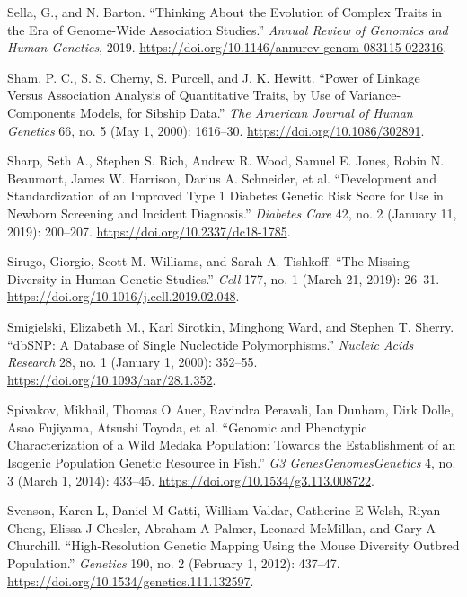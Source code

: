 \documentclass[
]{book}
\newlength{\cslhangindent}
\newlength{\cslentryspacingunit} %
\newenvironment{CSLReferences}[2] %
 {%
  \setlength{\parindent}{0pt}
  \ifodd #1
  \let\oldpar\par
  \def\par{\hangindent=\cslhangindent\oldpar}
  \fi
  \setlength{\parskip}{#2\cslentryspacingunit}
 }%
 {}
\begin{document}
\begin{CSLReferences}{1}{0}
\leavevmode{}%
Sella, G., and N. Barton. {``Thinking {About} the {Evolution} of {Complex Traits} in the {Era} of {Genome-Wide Association Studies}.''} \emph{Annual Review of Genomics and Human Genetics}, 2019. \url{https://doi.org/10.1146/annurev-genom-083115-022316}.

\leavevmode{}%
Sham, P. C., S. S. Cherny, S. Purcell, and J. K. Hewitt. {``Power of {Linkage} Versus {Association Analysis} of {Quantitative Traits}, by {Use} of {Variance-Components Models}, for {Sibship Data}.''} \emph{The American Journal of Human Genetics} 66, no. 5 (May 1, 2000): 1616--30. \url{https://doi.org/10.1086/302891}.

\leavevmode{}%
Sharp, Seth A., Stephen S. Rich, Andrew R. Wood, Samuel E. Jones, Robin N. Beaumont, James W. Harrison, Darius A. Schneider, et al. {``Development and {Standardization} of an {Improved Type} 1 {Diabetes Genetic Risk Score} for {Use} in {Newborn Screening} and {Incident Diagnosis}.''} \emph{Diabetes Care} 42, no. 2 (January 11, 2019): 200--207. \url{https://doi.org/10.2337/dc18-1785}.

\leavevmode{}%
Sirugo, Giorgio, Scott M. Williams, and Sarah A. Tishkoff. {``The {Missing Diversity} in {Human Genetic Studies}.''} \emph{Cell} 177, no. 1 (March 21, 2019): 26--31. \url{https://doi.org/10.1016/j.cell.2019.02.048}.

\leavevmode{}%
Smigielski, Elizabeth M., Karl Sirotkin, Minghong Ward, and Stephen T. Sherry. {``{dbSNP}: A Database of Single Nucleotide Polymorphisms.''} \emph{Nucleic Acids Research} 28, no. 1 (January 1, 2000): 352--55. \url{https://doi.org/10.1093/nar/28.1.352}.

\leavevmode{}%
Spivakov, Mikhail, Thomas O Auer, Ravindra Peravali, Ian Dunham, Dirk Dolle, Asao Fujiyama, Atsushi Toyoda, et al. {``Genomic and {Phenotypic Characterization} of a {Wild Medaka Population}: {Towards} the {Establishment} of an {Isogenic Population Genetic Resource} in {Fish}.''} \emph{G3 Genes\textbar Genomes\textbar Genetics} 4, no. 3 (March 1, 2014): 433--45. \url{https://doi.org/10.1534/g3.113.008722}.

\leavevmode{}%
Svenson, Karen L, Daniel M Gatti, William Valdar, Catherine E Welsh, Riyan Cheng, Elissa J Chesler, Abraham A Palmer, Leonard McMillan, and Gary A Churchill. {``High-{Resolution Genetic Mapping Using} the {Mouse Diversity Outbred Population}.''} \emph{Genetics} 190, no. 2 (February 1, 2012): 437--47. \url{https://doi.org/10.1534/genetics.111.132597}.


\end{CSLReferences}
\end{document}
